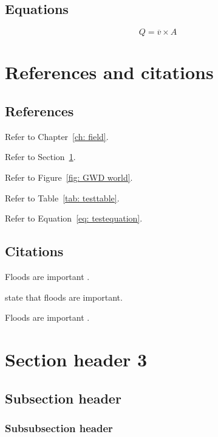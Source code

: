 \documentclass[twocolumn, 10pt, a4paper]{memoir}
\begin{document}
\subsection{Equations}

\begin{equation}
Q = \overline{v} \times A
\end{equation}
\label{eq: testequation}

\section{References and citations}
\label{sec: header 2}


\subsection{References}


Refer to Chapter~\ref{ch: field}.

Refer to Section~\ref{sec: header 2}.

Refer to Figure~\ref{fig: GWD world}.

Refer to Table~\ref{tab: testtable}.

Refer to Equation~\ref{eq: testequation}.


\subsection{Citations}


Floods are important \citep{Brauer2011}.

\cite{Brauer2011} state that floods are important.

Floods are important \citep[according to][]{Brauer2011}.

\section{Section header 3}

\subsection{Subsection header}

\subsubsection{Subsubsection header}



\end{document}
